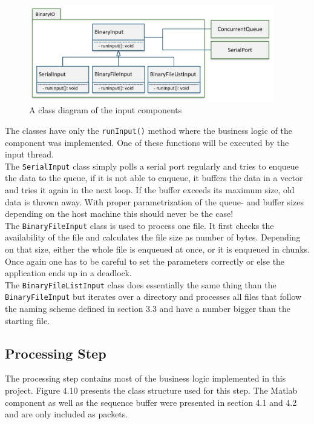 \begin{figure}[h]
\centering
      \includegraphics[width=0.95\textwidth]{input}
        \caption{A class diagram of the input components}
\end{figure}

The classes have only the \texttt{runInput()} method where the business logic of the component was implemented. One of these functions will be executed by the input thread. \\ The \texttt{SerialInput} class simply polls a serial port regularly and tries to enqueue the data to the queue, if it is not able to enqueue, it buffers the data in a vector and tries it again in the next loop. If the buffer exceeds its maximum size, old data is thrown away. With proper parametrization of the queue- and buffer sizes depending on the host machine this should never be the case!\\
The \texttt{BinaryFileInput} class is used to process one file. It first checks the availability of the file and calculates the file size as number of bytes. Depending on that size, either the whole file is enqueued at once, or it is enqueued in chunks. Once again one has to be careful to set the parameters correctly or else the application ends up  in a deadlock.\\
The \texttt{BinaryFileListInput} class does essentially the same thing than the \texttt{BinaryFileInput} but iterates over a directory and processes all files that follow the naming scheme defined in section 3.3 and have a number bigger than the starting file.
\subsection{Processing Step}
The processing step contains most of the business logic implemented in this project. Figure 4.10 presents the class structure used for this step. The Matlab component as well as the sequence buffer were presented in section 4.1 and 4.2 and are only included as packets.

